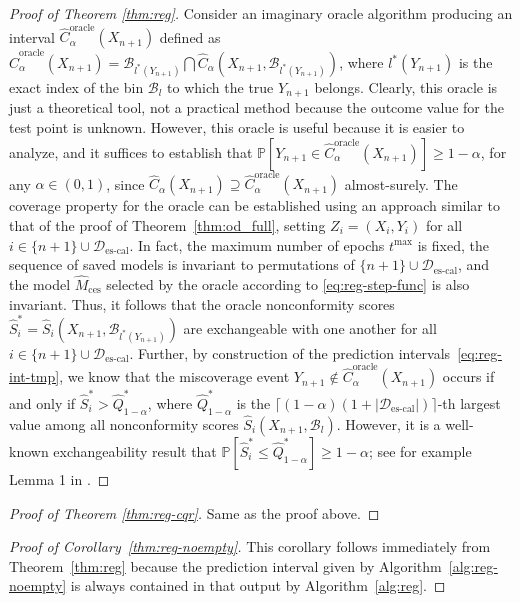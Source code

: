 \begin{proof}[Proof of Theorem \ref{thm:reg}]
Consider an imaginary oracle algorithm producing an interval $\hat{C}^{\text{oracle}}_{\alpha}(X_{n+1})$ defined as $\hat{C}^{\text{oracle}}_{\alpha}(X_{n+1}) = \mathcal{B}_{l^*(Y_{n+1})} \bigcap \hat{C}_{\alpha}(X_{n+1}, \mathcal{B}_{l^*(Y_{n+1})})$, where $l^*(Y_{n+1})$ is the exact index of the bin $\mathcal{B}_l$ to which the true $Y_{n+1}$ belongs. Clearly, this oracle is just a theoretical tool, not a practical method because the outcome value for the test point is unknown.
However, this oracle is useful because it is easier to analyze, and it suffices to establish that $\mathbb{P}[Y_{n+1} \in \hat{C}^{\text{oracle}}_{\alpha}(X_{n+1})] \geq 1-\alpha$, for any $\alpha \in (0,1)$, since $\hat{C}_{\alpha}(X_{n+1}) \supseteq \hat{C}^{\text{oracle}}_{\alpha}(X_{n+1})$ almost-surely.
The coverage property for the oracle can be established using an approach similar to that of the proof of Theorem~\ref{thm:od_full}, setting $Z_i=(X_i,Y_i)$ for all $i \in \{n+1\} \cup \mathcal{D}_{\text{es-cal}}$.
In fact, the maximum number of epochs $t^{\text{max}}$ is fixed, the sequence of saved models is invariant to permutations of $\{n+1\} \cup \mathcal{D}_{\text{es-cal}}$, and the  model $\hat{M}_{\text{ces}}$ selected by the oracle according to \eqref{eq:reg-step-func} is also invariant.
Thus, it follows that the oracle nonconformity scores $\hat{S}_i^* = \hat{S}_i(X_{n+1}, \mathcal{B}_{l^*(Y_{n+1})})$ are exchangeable with one another for all $i \in \{n+1\} \cup \mathcal{D}_{\text{es-cal}}$.
Further, by construction of the prediction intervals~\eqref{eq:reg-int-tmp}, we know that the miscoverage event $Y_{n+1} \not\in \hat{C}^{\text{oracle}}_{\alpha}(X_{n+1})$ occurs if and only if $\hat{S}^*_i > \hat{Q}^*_{1-\alpha}$, where $\hat{Q}^*_{1-\alpha}$ is the $\lceil (1-\alpha)(1+|\mathcal{D}_{\text{es-cal}}|) \rceil$-th largest value among all nonconformity scores $\hat{S}_i(X_{n+1},\mathcal{B}_l)$.
However, it is a well-known exchangeability result that $\mathbb{P}[\hat{S}^*_i \leq \hat{Q}^*_{1-\alpha}] \geq 1-\alpha$; see for example Lemma 1 in \citet{romano2019conformalized}.
\end{proof}


\begin{proof}[Proof of Theorem \ref{thm:reg-cqr}]
Same as the proof above. 
\end{proof}

\begin{proof}[Proof of Corollary~\ref{thm:reg-noempty}]
This corollary follows immediately from Theorem~\ref{thm:reg} because the prediction interval given by Algorithm~\ref{alg:reg-noempty} is always contained in that output by Algorithm~\ref{alg:reg}.
\end{proof}


